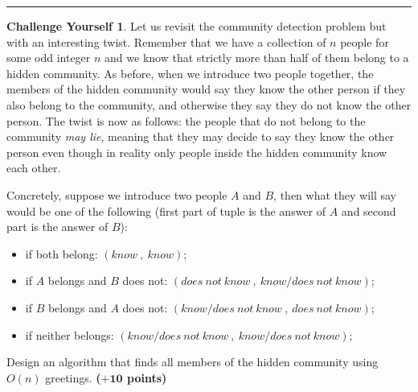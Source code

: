 \documentclass{article}
\theoremstyle{definition}
\newtheorem*{challenge}{Challenge Yourself}
\def\fline{\rule{0.75\linewidth}{0.5pt}}
\newcommand{\finishline}{\begin{center}\fline\end{center}}
\newcommand{\grade}[1]{\hfill{\textbf{($\mathbf{#1}$ points)}}}
\begin{document}
\smallskip

\finishline

\begin{challenge}
	Let us revisit the community detection problem but with an interesting twist. Remember that we have a collection of $n$ people for some odd integer $n$ and we know that strictly more than half of them belong to a hidden community. 
	As before, when we introduce two people together, the members of the hidden community would say they know the other person if they also belong to the community, and otherwise they say they do not know the other person. 
	The twist is now as follows: the people that do not belong to the community \emph{may lie}, meaning that they may decide to say they know the other person even though in reality only people inside the hidden community know each other.
	
	Concretely, 
	suppose we introduce two people $A$ and $B$, then what they will say would be one of the following (first part of tuple is the answer of $A$ and second part is the answer of $B$): 
	\begin{itemize}
		\item if both belong: $(know~,~know)$;
		\item if $A$ belongs  and $B$ does not: $(does\ not\ know~,~know/does\ not\ know)$; 
		\item if $B$ belongs  and $A$ does not: $(know/does\ not\ know~,~does\ not\ know)$; 
		\item if neither belongs:  $(know/does\ not\ know~,~know/does\ not\ know)$; 
	\end{itemize}
	Design an algorithm that finds all members of the hidden community using $O(n)$ greetings. \grade{+10} 
\end{challenge}
\end{document}
